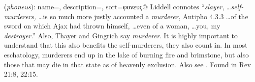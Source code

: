 \item[Murderer,]

(\textit{phoneus}):
{
    name=,
    description={},
    sort=φονευς@
}
Liddell connotes ``\emph{slayer}, \ldots \emph{self-murderers,} \ldots is so much more justly accounted a \emph{murderer}, Antipho 4.3.3 \ldots of the sword on which Ajax had thrown himself, \ldots even of a woman, \ldots you, my \emph{destroyer}.'' Also, Thayer and Gingrich say \emph{murderer}. It is highly important to understand that this also benefits the self-murderers, they also count in. In most eschatology, murderers end up in the lake of burning fire and brimstone, but also those that may die in that state as of heavenly exclusion. Also see .
Found in Rev 21:8, 22:15.
